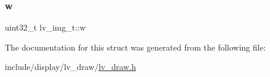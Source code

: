 \mbox{\label{structlv__img__t_a421ce2a4dfb0a0babec7c311e541a68f}} 
\subsubsection{\texorpdfstring{w}{w}}
{\footnotesize\ttfamily uint32\+\_\+t lv\+\_\+img\+\_\+t\+::w}



The documentation for this struct was generated from the following file\+:\begin{DoxyCompactItemize}
\item 
include/display/lv\+\_\+draw/\mbox{\hyperlink{lv__draw_8h}{lv\+\_\+draw.\+h}}\end{DoxyCompactItemize}

